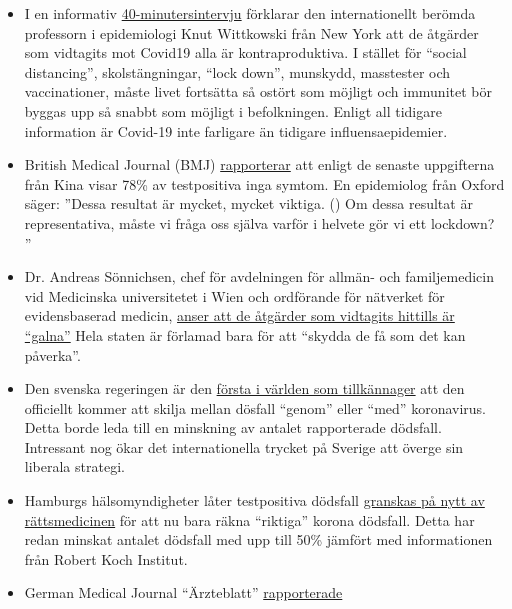 \begin{itemize}
\tightlist
\item
  I en informativ
  \href{https://www.youtube.com/watch?v=lGC5sGdz4kg}{40-minutersintervju}
  förklarar den internationellt berömda professorn i epidemiologi Knut
  Wittkowski från New York att de åtgärder som vidtagits mot Covid19
  alla är kontraproduktiva. I stället för ``social distancing'',
  skolstängningar, ``lock down'', munskydd, masstester och
  vaccinationer, måste livet fortsätta så ostört som möjligt och
  immunitet bör byggas upp så snabbt som möjligt i befolkningen. Enligt
  all tidigare information är Covid-19 inte farligare än tidigare
  influensaepidemier.
\item
  British Medical Journal (BMJ)
  \href{https://www.bmj.com/content/369/bmj.m1375}{rapporterar} att
  enligt de senaste uppgifterna från Kina visar 78\% av testpositiva
  inga symtom. En epidemiolog från Oxford säger: ''Dessa resultat är
  mycket, mycket viktiga. () Om dessa resultat är representativa, måste
  vi fråga oss själva varför i helvete gör vi ett lockdown? ''
\item
  Dr. Andreas Sönnichsen, chef för avdelningen för allmän- och
  familjemedicin vid Medicinska universitetet i Wien och ordförande för
  nätverket för evidensbaserad medicin,
  \href{https://www.diepresse.com/5794224/was-machen-wir-da-auf-den-intensivstationen-eigentlich}{anser
  att de åtgärder som vidtagits hittills är ``galna''} Hela staten är
  förlamad bara för att ``skydda de få som det kan påverka''.
\item
  Den svenska regeringen är den
  \href{https://www.telegraph.co.uk/news/2020/04/03/coronavirus-swedish-experiment-could-prove-britain-wrong/}{första
  i världen som tillkännager} att den officiellt kommer att skilja
  mellan dösfall ``genom'' eller ``med'' koronavirus. Detta borde leda
  till en minskning av antalet rapporterade dödsfall. Intressant nog
  ökar det internationella trycket på Sverige att överge sin liberala
  strategi.
\item
  Hamburgs hälsomyndigheter låter testpositiva dödsfall
  \href{https://www.t-online.de/nachrichten/deutschland/id_87636856/coronavirus-hamburg-will-nur-echte-covid-19-tote-zaehlen.html}{granskas
  på nytt av rättsmedicinen} för att nu bara räkna ``riktiga'' korona
  dödsfall. Detta har redan minskat antalet dödsfall med upp till 50\%
  jämfört med informationen från Robert Koch Institut.
\item
  German Medical Journal ``Ärzteblatt''
  \href{https://www.aerzteblatt.de/nachrichten/97750/Vielzahl-an-Lungenentzuendungen-beunruhigen-Behoerden-in-Norditalien}{rapporterade}

\end{itemize}
